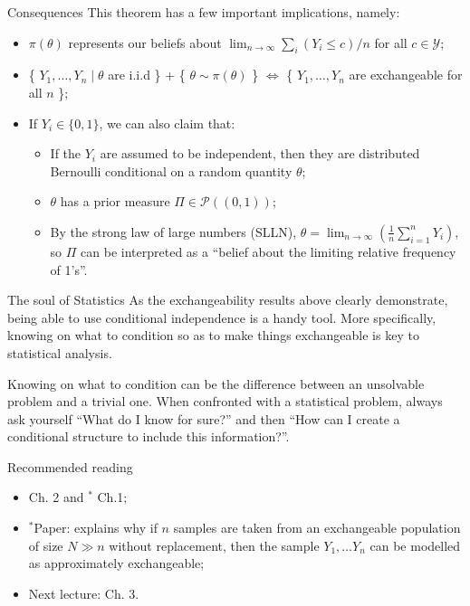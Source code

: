 \begin{frame}{Consequences}
  This theorem has a few important implications, namely:
 \begin{itemize}
  \item $\pi(\theta)$ represents our beliefs about $\lim_{n\to\infty} \sum_i (Y_i \leq c)/n$ for all $c \in \mathcal{Y}$;
  \item \{ $Y_1, \ldots, Y_n \mid \theta $ are i.i.d \} + \{ $\theta \sim \pi(\theta)$ \} $\iff$ \{ $Y_1, \ldots, Y_n$ are exchangeable for all $n$ \};
  \item If $Y_i \in \{0, 1\}$, we can also claim that:
  \begin{itemize}
   \item If the $Y_i$ are assumed to be independent, then they are distributed Bernoulli conditional on a random quantity $\theta$;
   \item $\theta$ has a prior measure $\Pi \in \mathcal{P}( (0, 1) )$;
   \item By the strong law of large numbers (SLLN), $\theta = \lim_{n \to \infty} (\frac{1}{n}\sum_{i=1}^n Y_i)$, so $\Pi$ can be interpreted as a ``belief about the limiting relative frequency of 1's''.
  \end{itemize}
 \end{itemize}
\end{frame}
\begin{frame}{The soul of Statistics}
 As the exchangeability results above clearly demonstrate, being able to use conditional independence is a handy tool.
 More specifically, knowing on what to condition so as to make things exchangeable is key to statistical analysis.
 \begin{idea} 
 \label{idea:conditioning_soul}
 Knowing on what to condition can be the difference between an unsolvable problem and a trivial one.
 When confronted with a statistical problem, always ask yourself ``What do I know for sure?'' and then ``How can I create a conditional structure to include this information?''.
 \end{idea}
\end{frame}
\begin{frame}{Recommended reading}
\begin{itemize}
  \item[\faBook] \cite{Hoff2009} Ch. 2 and $^\ast$\cite{Schervish2012} Ch.1;
 \item $^\ast$Paper: \cite{Diaconis1980} explains why if $n$ samples are taken from an exchangeable population of size $N \gg n$ without replacement, then the sample $Y_1, \ldots Y_n$ can be modelled as approximately exchangeable;
 \item[\faForward] Next lecture: \cite{Robert2007} Ch. 3.
 \end{itemize} 
\end{frame}
